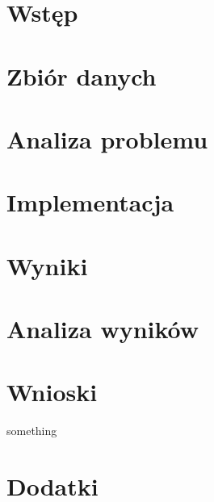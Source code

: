 \documentclass{article}
\begin{document}
\begin{titlepage}
    
\end{titlepage}

\section{Wstęp}

\section{Zbiór danych}
\section{Analiza problemu}
\section{Implementacja}
\section{Wyniki}
\section{Analiza wyników}
\section{Wnioski}

something\cite{something}

\printbibliography[title={Bibliografia}]

\section*{Dodatki}
\end{document}
